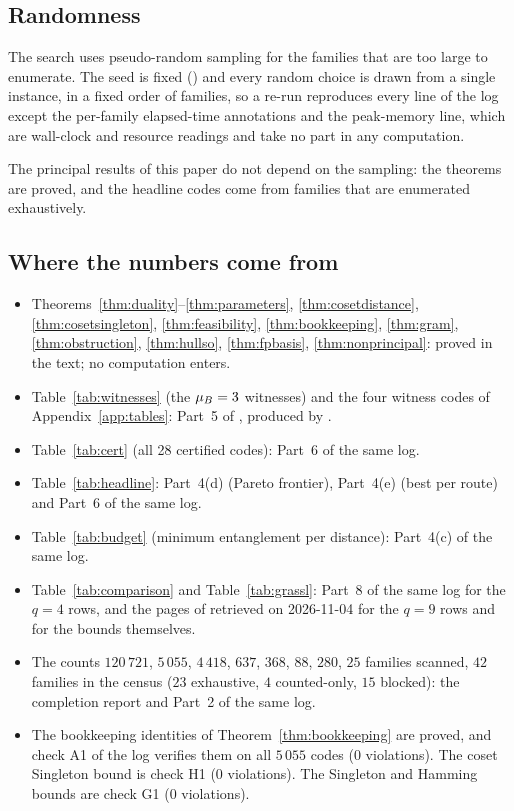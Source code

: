 \subsection{Randomness}

The search uses pseudo-random sampling for the families that are too large to
enumerate. The seed is fixed () and every random
choice is drawn from a single  instance, in a
fixed order of families, so a re-run reproduces every line of the log except
the per-family elapsed-time annotations and the peak-memory line, which are
wall-clock and resource readings and take no part in any computation.

The principal results of this paper do not depend on the sampling: the
theorems are proved, and the headline codes come from families that are
enumerated exhaustively.

\subsection{Where the numbers come from}

\begin{itemize}[leftmargin=*]
\item Theorems~\ref{thm:duality}--\ref{thm:parameters},
  \ref{thm:cosetdistance}, \ref{thm:cosetsingleton},
  \ref{thm:feasibility}, \ref{thm:bookkeeping}, \ref{thm:gram},
  \ref{thm:obstruction}, \ref{thm:hullso}, \ref{thm:fpbasis},
  \ref{thm:nonprincipal}: proved in the text; no computation enters.
\item Table~\ref{tab:witnesses} (the $\mu_{B}=3$ witnesses) and the four
  witness codes of Appendix~\ref{app:tables}: Part~5 of
  , produced by
  .
\item Table~\ref{tab:cert} (all 28 certified codes): Part~6 of the same log.
\item Table~\ref{tab:headline}: Part~4(d) (Pareto frontier), Part~4(e) (best
  per route) and Part~6 of the same log.
\item Table~\ref{tab:budget} (minimum entanglement per distance): Part~4(c)
  of the same log.
\item Table~\ref{tab:comparison} and Table~\ref{tab:grassl}: Part~8 of the
  same log for the $q=4$ rows, and the pages of \cite{GrasslCodetables}
  retrieved on 2026-11-04 for the $q=9$ rows and for the bounds themselves.
\item The counts $120\,721$, $5\,055$, $4\,418$, $637$, $368$, $88$, $280$,
  $25$ families scanned, $42$ families in the census ($23$ exhaustive, $4$
  counted-only, $15$ blocked): the completion report and Part~2 of the same
  log.
\item The bookkeeping identities of Theorem~\ref{thm:bookkeeping} are
  proved, and check A1 of the log verifies them on all $5\,055$ codes
  ($0$ violations). The coset Singleton bound is check H1 ($0$ violations).
  The Singleton and Hamming bounds are check G1 ($0$ violations).
\end{itemize}

